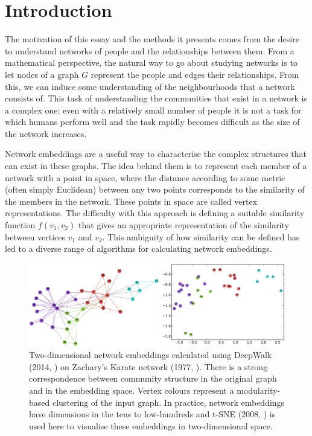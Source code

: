 \documentclass[a4paper]{article}
\begin{document}


\tableofcontents

\section{Introduction}
The motivation of this essay and the methods it presents comes from the desire to understand networks of people and the relationships between them.
From a mathematical perspective, the natural way to go about studying networks is to let nodes of a graph $G$ represent the people and edges their relationships.
From this, we can induce some understanding of the neighbourhoods that a network consists of. This task of understanding the communities that exist in a network is a complex one; 
even with a relatively small number of people it is not a task for which humans perform well and the task rapidly becomes difficult as the size of the network increases.\par
Network embeddings are a useful way to characterise the complex structures that
can exist in these graphs. The idea behind them is to represent each member of a
network with a point in space, where the distance according to some metric
(often simply Euclidean) between any two points corresponds to the similarity of
the members in the network. These points in space are called vertex
representations. The difficulty with this approach is defining a suitable
similarity function $f(v_1,v_2)$ that gives an appropriate representation of the similarity between vertices $v_1$ and $v_2$. This ambiguity of how similarity can be defined has led to a diverse range of algorithms for calculating network embeddings.

\begin{figure}[h!]
  \centering
  \includegraphics[width = 1\textwidth]{src/DeepWalkOnKarateGraph.png}

  \caption{Two-dimensional network embeddings calculated using
    DeepWalk (2014, \cite{deepwalk}) on Zachary's Karate network (1977, \cite{zachary1977}). There is a strong
    correspondence between community structure in the original graph and
    in the embedding space. Vertex colours represent a modularity-based
    clustering of the input graph. In practice, network embeddings have dimensions
    in the tens to low-hundreds and t-SNE (2008, \cite{maaten2008}) is used here to visualise these embeddings in two-dimensional
    space.}
\end{figure}
\end{document}
